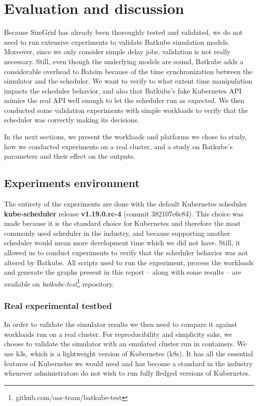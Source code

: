\chapter{Evaluation and discussion}

Because SimGrid has already been thoroughly tested and validated, we do not
need to run extensive experiments to validate Batkube simulation models.
Moreover, since we only consider simple delay jobs, validation is not really
necessary. Still, even though the underlying models are sound, Batkube adds a
considerable overhead to Batsim because of the time synchronization between the
simulator and the scheduler. We want to verify to what extent time manipulation
impacts the scheduler behavior, and also that Batkube's fake Kubernetes API
mimics the real API well enough to let the scheduler run as expected. We then
conducted some validation experiments with simple workloads to verify that the
scheduler was correctly making its decisions.

In the next sections, we present the workloads and platforms we chose to study,
how we conducted experiments on a real cluster, and a study on Batkube's
parameters and their effect on the outputs.

\section{Experiments environment}

The entirety of the experiments are done with the default Kubernetes scheduler
\textbf{kube-scheduler} release \textbf{v1.19.0.rc-4} (commit 382107e6c84).
This choice was made because it is the standard choice for Kubernetes and
therefore the most commonly used scheduler in the industry, and because
supporting another scheduler would mean more development time which we did not
have. Still, it allowed us to conduct experiments to verify that the scheduler
behavior was not altered by Batkube.  All scripts used to run the experiment,
process the workloads and generate the graphs present in this report -- along
with some results -- are available on
\textit{batkube-test}\footnote{github.com/oar-team/batkube-test} repository.

\subsection{Real experimental testbed}

In order to validate the simulator results we then need to compare it against
workloads run on a real cluster. For reproducibility and simplicity sake, we
choose to validate the simulator with an emulated cluster run in containers. We
use k3s, which is a lightweight version of Kubernetes (k8s). It has all the
essential features of Kubernetes we would need and has become a standard in the
industry whenever administrators do not wish to run fully fledged versions of
Kubernetes.\\

